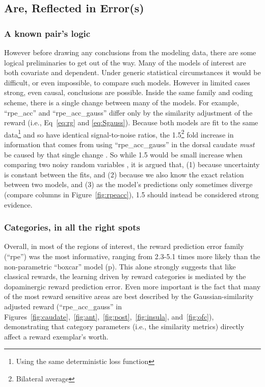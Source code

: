 \subsection{Are, Reflected in Error(s)}
\label{sub:inerror}
\subsubsection{A known pair's logic}
\label{subsub:onestep}
However before drawing any conclusions from the modeling data, there are some logical preliminaries to get out of the way.  Many of the models of interest are both covariate and dependent.  Under generic statistical circumstances it would be difficult, or even impossible, to compare such models.  However in limited cases strong, even causal, conclusions are possible.   Inside the same family and coding scheme, there is a single change between many of the models.  For example, ``rpe\_acc'' and ``rpe\_acc\_gauss'' differ only by the similarity adjustment of the reward (i.e., Eq~\ref{eq:rg} and \ref{eq:Sgauss}).  Because both models are fit to the same data\footnote{Using the same deterministic loss function} and so have identical signal-to-noise ratios, the 1.5\footnote{Bilateral average} fold increase in information that comes from using ``rpe\_acc\_gauss'' in the dorsal caudate \emph{must} be caused by that single change \cite{Pearl:2010p9726}.  So while 1.5 would be small increase when comparing two noisy random variables \cite{Anderson:2000p9475,Forster:2000p9623}, it is argued that, (1) because uncertainty is constant between the fits, and (2) because we also know the exact relation between two models, and (3) as the model's predictions only sometimes diverge (compare columns in Figure~\ref{fig:rpeacc}), 1.5 should instead be considered strong evidence.

\subsubsection{Categories, in all the right spots}
\label{subsub:rightspots}
Overall, in most of the regions of interest, the reward prediction error family (``rpe'') was the most informative, ranging from 2.3-5.1 times more likely than the non-parametric ``boxcar'' model (p\pageref{subsub:belowctx}).  This alone strongly suggests that like classical rewards, the learning driven by reward categories is mediated by the dopaminergic reward prediction error.  Even more important is the fact that many of the most reward sensitive areas are best described by the Gaussian-similarity adjusted reward (``rpe\_acc\_gauss'' in Figures~\ref{fig:caudate},~\ref{fig:ant},~\ref{fig:post},~\ref{fig:insula}, and~\ref{fig:ofc}), demonstrating that category parameters (i.e., the similarity metrics) directly affect a reward exemplar's worth.

